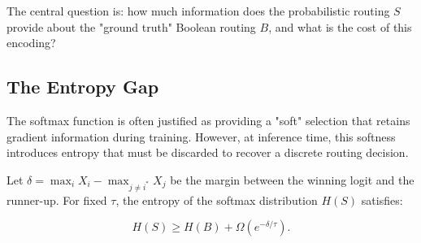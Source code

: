 The central question is: how much information does the probabilistic routing $S$ provide about the "ground truth" Boolean routing $B$, and what is the cost of this encoding?













\subsection{The Entropy Gap}













The softmax function is often justified as providing a "soft" selection that retains gradient information during training. However, at inference time, this softness introduces entropy that must be discarded to recover a discrete routing decision.













\begin{theorem}






\label{thm:entropy}






Let $\delta = \max_i X_i - \max_{j \neq i^*} X_j$ be the margin between the winning logit and the runner-up. For fixed $\tau$, the entropy of the softmax distribution $H(S)$ satisfies:






\[






H(S) \ge H(B) + \Omega\left(e^{-\delta/\tau}\right).






\]






\end{theorem}














